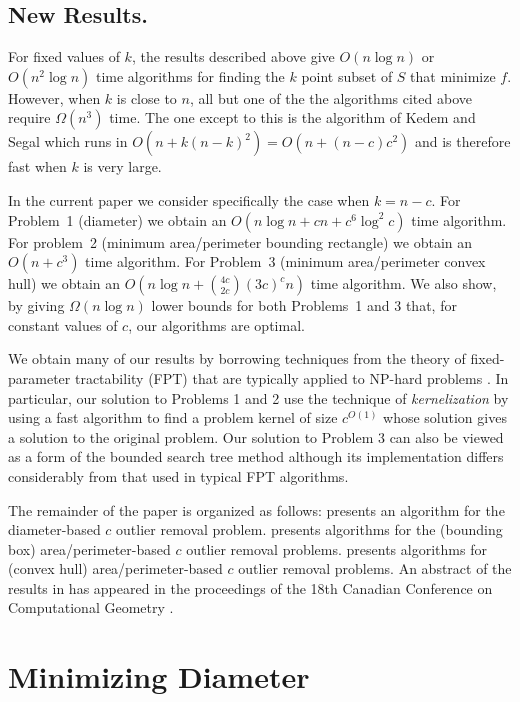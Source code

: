 \documentclass{elsart}
\newcommand{\runtime}{n\log n + {4c\choose 2c}(3c)^cn}
\newcommand{\Oruntime}{O\left(\runtime\right)}
\begin{document}
\subsection{New Results.}

For fixed values of $k$, the results described above give $O(n\log n)$
or $O(n^2\log n)$ time algorithms for finding the $k$ point subset of
$S$ that minimize $f$.  However, when $k$ is close to $n$, all but one
of the the algorithms cited above require $\Omega(n^3)$ time.  The one
except to this is the algorithm of Kedem and Segal \cite{ks00} which
runs in $O(n + k(n-k)^2) = O(n + (n-c)c^2)$ and is therefore fast when
$k$ is very large.

In the current paper we consider specifically the case when $k=n-c$.
For Problem~1 (diameter) we obtain an $O(n\log n + cn + c^6\log^2 c)$
time algorithm.  For problem~2 (minimum area/perimeter bounding
rectangle) we obtain an $O(n + c^3)$ time algorithm.  For Problem~3
(minimum area/perimeter convex hull) we obtain an $\Oruntime$ time
algorithm.  We also show, by giving $\Omega(n\log n)$ lower bounds for
both Problems~1 and 3 that, for constant values of $c$, our algorithms
are optimal.

We obtain many of our results by borrowing techniques from the theory
of fixed-parameter tractability (FPT) that are typically applied to
NP-hard problems \cite{dfXX}.  In particular, our solution to Problems
1 and 2 use the technique of \emph{kernelization} by using a fast
algorithm to find a problem kernel of size $c^{O(1)}$ whose solution
gives a solution to the original problem.  Our solution to Problem 3
can also be viewed as a form of the bounded search tree method
\cite{dfXX} although its implementation differs considerably from that
used in typical FPT algorithms.

The remainder of the paper is organized as follows: 
presents an algorithm for the diameter-based $c$ outlier removal
problem.   presents algorithms for the (bounding box)
area/perimeter-based $c$ outlier removal problems.  
presents algorithms for (convex hull) area/perimeter-based $c$
outlier removal problems.  An abstract of the results in 
has appeared in the proceedings of the 18th Canadian Conference on
Computational Geometry \cite{amw06}.

\section{Minimizing Diameter}
\end{document}
